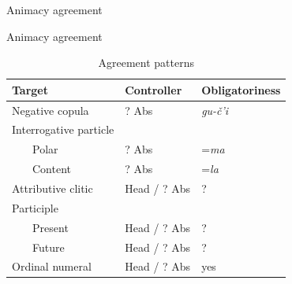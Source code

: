 \begin{frame}{Animacy agreement}



    
\end{frame}


\begin{frame}{Animacy agreement}

\begin{table}[]
\caption{Agreement patterns}
\label{tab:anagr}
\begin{center}
\begin{tabular}{llll}
\multicolumn{2}{l}{Target}                 & Controller   & Obligatoriness \\ \hline
\multicolumn{2}{l}{Negative copula}        & ? Abs          & \textit{gu-č’i}         \\
\multicolumn{2}{l}{Interrogative particle} &              &                \\
                  & Polar                  & ? Abs          & =\textit{ma}            \\
                  & Content                & ? Abs          & =\textit{la}            \\
\multicolumn{2}{l}{Attributive clitic}     & Head / ? Abs & ?              \\
\multicolumn{2}{l}{Participle}             &              &                \\
                  & Present                & Head / ? Abs & ?              \\
                  & Future                 & Head / ? Abs & ?              \\
\multicolumn{2}{l}{Ordinal numeral}        & Head / ? Abs & yes           
\end{tabular}
\end{center}
\end{table}
    
\end{frame}

